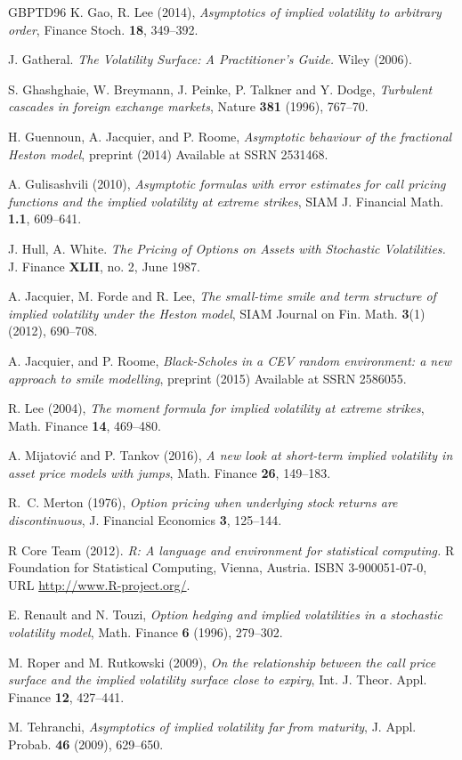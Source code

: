 \documentclass[a4paper,reqno,11pt]{amsart}
\numberwithin{equation}{section}
\begin{document}
\begin{thebibliography}{GBPTD96}
K. Gao, R. Lee (2014),
\textit{Asymptotics of implied volatility to arbitrary order},
Finance Stoch. \textbf{18}, 349--392.

J. Gatheral.
\textit{The Volatility Surface: A Practitioner's Guide.}
Wiley (2006).

S. Ghashghaie, W. Breymann, J. Peinke, P. Talkner and Y. Dodge, 
\textit{Turbulent cascades in foreign exchange markets}, 
Nature \textbf{381} (1996), 767--70.

H. Guennoun, A. Jacquier, and P. Roome,  
\emph{Asymptotic behaviour of the fractional Heston model},
preprint (2014)
Available at SSRN 2531468.

A. Gulisashvili (2010), 
\textit{Asymptotic formulas with error estimates for call pricing functions and the 
implied volatility at extreme strikes},
SIAM J. Financial Math. \textbf{1.1}, 609--641.

 J. Hull, A. White.
\emph{The Pricing of Options on Assets with Stochastic Volatilities.}
J. Finance \textbf{XLII}, no. 2, June 1987.

A. Jacquier, M. Forde and R. Lee,
\textit{The small-time smile and term structure of implied volatility under the Heston model},
SIAM Journal on Fin. Math. \textbf{3}(1) (2012), 690--708.

A. Jacquier, and P. Roome,
\emph{Black-Scholes in a CEV random environment: a new approach to smile modelling},
preprint (2015)
Available at SSRN 2586055.

R. Lee (2004),
\textit{The moment formula for implied volatility at extreme strikes},
Math. Finance \textbf{14}, 469--480.

A. Mijatovi\'{c} and P. Tankov (2016),
\textit{A new look at short-term implied volatility in asset price models with jumps},
Math. Finance {\bf 26}, 149--183.

R.~C. Merton (1976),
\textit{Option pricing when underlying stock returns are discontinuous},
J. Financial Economics \textbf{3}, 125--144.

R Core Team (2012). 
\emph{R: A language and environment for
  statistical computing.} R Foundation for Statistical Computing,
  Vienna, Austria. ISBN 3-900051-07-0, URL
  \url{http://www.R-project.org/}.


E. Renault and N. Touzi,
\textit{Option hedging and implied volatilities in a stochastic volatility model},
Math. Finance \textbf{6} (1996), 279--302.

M. Roper and M. Rutkowski (2009),
\textit{On the relationship between the call price surface and the 
implied volatility surface close to expiry},
Int. J. Theor. Appl. Finance \textbf{12}, 427--441.

M. Tehranchi,
\textit{Asymptotics of implied volatility far from maturity},
J. Appl. Probab. \textbf{46} (2009), 629--650.

\end{thebibliography}
\end{document}
